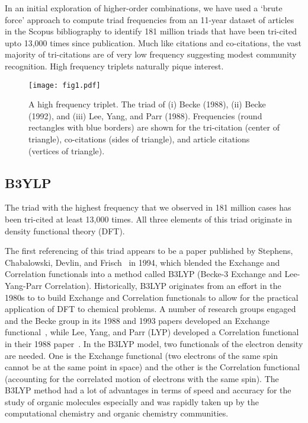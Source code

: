 \documentclass[notitlepage]{report}
\begin{document}
 In an initial exploration of higher-order combinations, we have used a `brute force' approach to compute triad frequencies from an 11-year dataset of articles in the Scopus bibliography to identify 181 million triads that have been tri-cited upto 13,000 times since publication. Much like citations and co-citations, the vast majority of tri-citations are of very low frequency suggesting modest community recognition. High frequency triplets naturally pique interest. 

\begin{figure}[h!]
\begin{center}
\texttt{[image: fig1.pdf]}%
\end{center}
\caption{A high frequency triplet. The triad of (i) Becke (1988), (ii) Becke (1992), and (iii) Lee, Yang, and Parr (1988).  Frequencies (round rectangles with blue borders) are shown for the tri-citation (center of triangle), co-citations (sides of triangle), and 
article citations (vertices of triangle). 
}
\label{fig:fig1}
\end{figure}

\subsection*{B3YLP} The triad with the highest frequency that we observed in 181 million cases has been tri-cited at least 13,000 times.  All three elements of this triad originate in density functional theory (DFT).

The first referencing of this triad appears to be a paper published by Stephens, Chabalowski, Devlin, and Frisch~\citep{stephens1994ab} in 1994, which blended the Exchange and Correlation functionals into a method called B3LYP (Becke-3 Exchange and Lee-Yang-Parr Correlation). Historically, B3LYP originates from an effort in the 1980s to to build Exchange and Correlation functionals to allow for the practical application of DFT to chemical problems. A number of research groups engaged and the Becke group in its 1988 and 1993 papers developed an Exchange functional~\citep{becke1988density,becke1993dft}, while Lee, Yang, and Parr (LYP) developed a Correlation functional in their 1988 paper~\citep{lyp1988}.  In the B3LYP model, two functionals of the electron density are needed. One is the Exchange functional (two electrons of the same spin cannot be at the same point in space) and the other is the Correlation functional (accounting for the correlated motion of electrons with the same spin). The B3LYP method had a lot of advantages in terms of speed and accuracy for the study of organic molecules especially and was rapidly taken up by the computational chemistry and organic chemistry communities.
\end{document}
